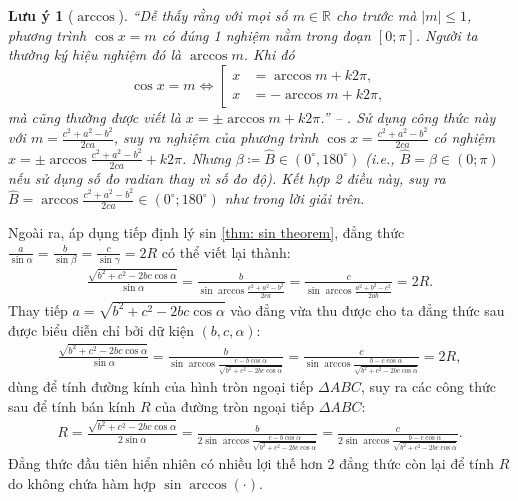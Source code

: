 \documentclass[oneside]{book}
\numberwithin{equation}{section}
\newtheorem{luuy}{Lưu ý}[section]
\begin{document}
\begin{luuy}[$\arccos$]
	``Dễ thấy rằng với mọi số $m\in\mathbb{R}$ cho trước mà $|m|\le 1$, phương trình $\cos x = m$ có đúng 1 nghiệm nằm trong đoạn $[0;\pi]$. Người ta thường ký hiệu nghiệm đó là $\arccos m$. Khi đó
	\begin{equation*}
		\cos x = m\Leftrightarrow\left[\begin{split}
			x &= \arccos m + k2\pi,\\
			x &= -\arccos m + k2\pi,
		\end{split}\right.
	\end{equation*}
	mà cũng thường được viết là $x = \pm\arccos m + k2\pi$.'' -- \cite[p. 24]{SGK_Toan_11_dai_so_giai_tich_nang_cao}. Sử dụng công thức này với $m = \frac{c^2 + a^2 - b^2}{2ca}$, suy ra nghiệm của phương trình $\cos x = \frac{c^2 + a^2 - b^2}{2ca}$ có nghiệm $x = \pm\arccos\frac{c^2 + a^2 - b^2}{2ca} + k2\pi$. Nhưng $\beta\coloneqq\widehat{B}\in(0^\circ,180^\circ)$ (i.e., $\widehat{B} = \beta\in(0;\pi)$ nếu sử dụng số đo radian thay vì số đo độ). Kết hợp 2 điều này, suy ra $\widehat{B} = \arccos\frac{c^2 + a^2 - b^2}{2ca}\in(0^\circ;180^\circ)$ như trong lời giải trên.
\end{luuy}
Ngoài ra, áp dụng tiếp định lý sin \ref{thm: sin theorem}, đẳng thức $\frac{a}{\sin\alpha} = \frac{b}{\sin\beta} = \frac{c}{\sin\gamma} = 2R$ có thể viết lại thành:
\begin{align*}
	\frac{\sqrt{b^2 + c^2 - 2bc\cos\alpha}}{\sin\alpha} = \frac{b}{\sin\arccos\frac{c^2 + a^2 - b^2}{2ca}} = \frac{c}{\sin\arccos\frac{a^2 + b^2 - c^2}{2ab}} = 2R.
\end{align*}
Thay tiếp $a = \sqrt{b^2 + c^2 - 2bc\cos\alpha}$ vào đẳng vừa thu được cho ta đẳng thức sau được biểu diễn chỉ bởi dữ kiện $(b,c,\alpha)$:
\begin{align*}
	\frac{\sqrt{b^2 + c^2 - 2bc\cos\alpha}}{\sin\alpha} = \frac{b}{\sin\arccos\frac{c - b\cos\alpha}{\sqrt{b^2 + c^2 - 2bc\cos\alpha}}} = \frac{c}{\sin\arccos\frac{b - c\cos\alpha}{\sqrt{b^2 + c^2 - 2bc\cos\alpha}}} = 2R,
\end{align*}
dùng để tính đường kính của hình tròn ngoại tiếp $\Delta ABC$, suy ra các công thức sau để tính bán kính $R$ của đường tròn ngoại tiếp $\Delta ABC$:
\begin{align*}
	R = \frac{\sqrt{b^2 + c^2 - 2bc\cos\alpha}}{2\sin\alpha} = \frac{b}{2\sin\arccos\frac{c - b\cos\alpha}{\sqrt{b^2 + c^2 - 2bc\cos\alpha}}} = \frac{c}{2\sin\arccos\frac{b - c\cos\alpha}{\sqrt{b^2 + c^2 - 2bc\cos\alpha}}}.
\end{align*}
Đẳng thức đầu tiên hiển nhiên có nhiều lợi thế hơn 2 đẳng thức còn lại để tính $R$ do không chứa hàm hợp $\sin\arccos(\cdot)$.
\end{document}
